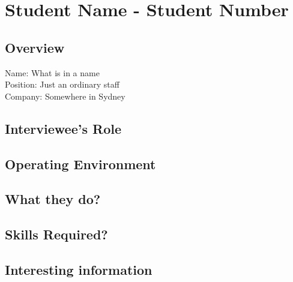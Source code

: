 \chapter{Student Name - Student Number}

\section{Overview}
\noindent Name: What is in a name
\\
Position: Just an ordinary staff
\\
Company: Somewhere in Sydney 

\section{Interviewee's Role}

\section{Operating Environment}

\section{What they do?}

\section{Skills Required?}

\section{Interesting information}

